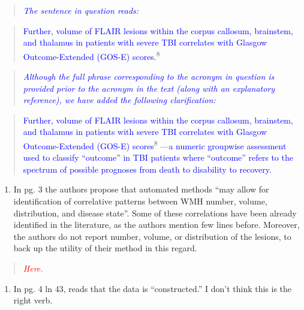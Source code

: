 \documentclass[12pt,]{article}
\providecommand{\tightlist}{%
  \setlength{\itemsep}{0pt}\setlength{\parskip}{0pt}}
\begin{document}
\begin{quote}
\emph{\textcolor{blue}{The sentence in question reads:}}
\end{quote}

\begin{quote}
\textcolor{blue}{Further, volume of FLAIR lesions within the corpus
callosum, brainstem, and thalamus in patients with severe TBI correlates
with Glasgow Outcome-Extended (GOS-E) scores.}\textsuperscript{8}
\end{quote}

\begin{quote}
\emph{\textcolor{blue}{Although the full phrase corresponding to the acronym
in question is provided prior to the acronym in the text (along with an
explanatory reference), we have added the following clarification:}}
\end{quote}

\begin{quote}
\textcolor{blue}{Further, volume of FLAIR lesions within the corpus
callosum, brainstem, and thalamus in patients with severe TBI correlates
with Glasgow Outcome-Extended (GOS-E) scores}\textsuperscript{8}
\textcolor{blue}{---a numeric groupwise assessment used to
classify ``outcome'' in TBI patients where ``outcome'' refers to the
spectrum of possible prognoses from death to disability to recovery.}
\end{quote}

\begin{enumerate}
\def\labelenumi{\arabic{enumi}.}
\setcounter{enumi}{8}
\tightlist
\item
  In pg. 3 the authors propose that automated methods ``may allow for
  identification of correlative patterns between WMH number, volume,
  distribution, and disease state''. Some of these correlations have
  been already identified in the literature, as the authors mention few
  lines before. Moreover, the authors do not report number, volume, or
  distribution of the lesions, to back up the utility of their method in
  this regard.
\end{enumerate}

\begin{quote}
\emph{\textcolor{red}{Here.}}
\end{quote}

\begin{enumerate}
\def\labelenumi{\arabic{enumi}.}
\setcounter{enumi}{9}
\tightlist
\item
  In pg. 4 ln 43, reads that the data is ``constructed.'' I don't think
  this is the right verb.
\end{enumerate}
\end{document}
